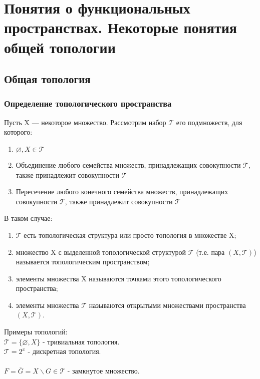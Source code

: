 \chapter{Понятия о функциональных пространствах.
 Некоторые понятия общей топологии}
\section{Общая топология}
\subsection{Определение топологического пространства}

Пусть X — некоторое множество. Рассмотрим набор $\mathcal{T}$ его подмножеств, для которого: 
\begin{enumerate}
\item $\varnothing, X \in \mathcal{T}$
\item Объединение любого семейства множеств, принадлежащих совокупности $\mathcal{T}$, также принадлежит совокупности $\mathcal{T}$
\item Пересечение любого конечного семейства множеств, принадлежащих совокупности $\mathcal{T}$, также принадлежит совокупности $\mathcal{T}$
\end{enumerate}
В таком случае: 
\begin{enumerate}
\item $\mathcal{T}$ есть топологическая структура или просто топология в множестве X; 
\item   множество X с выделенной топологической структурой $\mathcal{T}$ (т.е. пара $(X, \mathcal{T})$) называется топологическим пространством;
\item   элементы множества X называются точками этого топологического пространства; 
\item   элементы множества $\mathcal{T}$ называются открытыми множествами пространства $(X, \mathcal{T})$. 
\end{enumerate}
Примеры топологий: \\
$\mathcal{T} = \{\varnothing, X\}$ - тривиальная топология. \\
$\mathcal{T} = 2^x$ - дискретная топология. \\ \\
$F = \overline{G} = X \backslash G \in \mathcal{T}$ - замкнутое множество.

